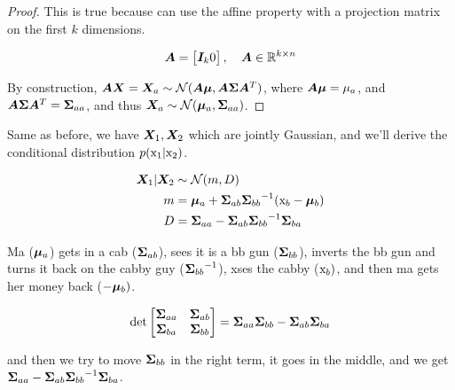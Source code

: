 \begin{tcolorbox}
\begin{proof}
        This is true because can use the affine property with a projection matrix on the first $k$ dimensions.
        
        \begin{equation}
            {\bm{A}} = \begin{bmatrix} {\bm{I}}_k 0 \end{bmatrix}, \quad {\bm{A}} \in {\mathbb{R}}^{k \times n}
        \end{equation}
        
        By construction, ${\bm{A}} {\bm{X}} = {\bm{X}}_a \sim {\mathcal{N}}({\bm{A}} {\bm{\mu}}, {\bm{A}} {\bm{\Sigma}} {\bm{A}}^T)$, where ${\bm{A}} {\bm{\mu}} = \mu_a$, and ${\bm{A}} {\bm{\Sigma}} {\bm{A}}^T = {\bm{\Sigma}}_{aa}$, and thus ${\bm{X}}_a \sim {\mathcal{N}}({\bm{\mu}}_a, {\bm{\Sigma}}_{aa})$.
    \end{proof}
    
    \begin{thm}
        Same as before, we have ${\bm{X}}_1, {\bm{X}}_2$ which are jointly Gaussian, and we'll derive the conditional distribution $p({\textnormal{x}}_1 | {\textnormal{x}}_2)$.
    \end{thm}
    
    \begin{align}
        {\bm{X}}_1 | {\bm{X}}_2 & \sim {\mathcal{N}}(m, D) \\
        m &= {\bm{\mu}}_a + {{\bm{\Sigma}}_{ab}} {{\bm{\Sigma}}_{bb}}^{-1} ( {\textnormal{x}}_b - {\bm{\mu}}_b) \\
        D &= {{\bm{\Sigma}}_{aa}} - {{\bm{\Sigma}}_{ab}} {{\bm{\Sigma}}_{bb}}^{-1} {{\bm{\Sigma}}_{ba}}
    \end{align}
    
    Ma (${\bm{\mu}}_a$) gets in a cab (${{\bm{\Sigma}}_{ab}}$), sees it is a bb gun (${{\bm{\Sigma}}_{bb}}$), inverts the bb gun and turns it back on the cabby guy (${{\bm{\Sigma}}_{bb}}^{-1}$), xses the cabby (${\textnormal{x}}_b)$, and then ma gets her money back ($- {\bm{\mu}}_b)$.
    
    \begin{equation}
        \det \begin{bmatrix}
            {\bm{\Sigma}}_{aa} & {\bm{\Sigma}}_{ab} \\
            {\bm{\Sigma}}_{ba} & {\bm{\Sigma}}_{bb}
        \end{bmatrix} = {{\bm{\Sigma}}_{aa}} {{\bm{\Sigma}}_{bb}} - {{\bm{\Sigma}}_{ab}} {{\bm{\Sigma}}_{ba}}
    \end{equation}
    
    and then we try to move ${{\bm{\Sigma}}_{bb}}$ in the right term, it goes in the middle, and we get ${{\bm{\Sigma}}_{aa}} - {{\bm{\Sigma}}_{ab}} {{\bm{\Sigma}}_{bb}}^{-1} {{\bm{\Sigma}}_{ba}}$.

\end{tcolorbox}
